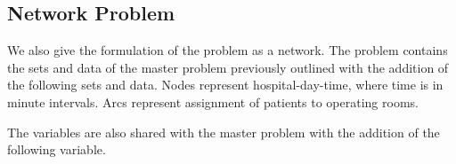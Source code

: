 \subsection{Network Problem}
We also give the formulation of the problem as a network. The problem contains the sets
and data of the master problem previously outlined with the addition of the following 
sets and data. Nodes represent hospital-day-time, where time is in minute intervals. Arcs represent assignment of patients to operating rooms.
\begin{table}[H]
    \caption*{\bf{SETS}}
    \end{table}
    \begin{table}[H]
        \caption*{\bf{DATA}}
        \end{table}
    The variables are also shared with the master problem with the addition of the following variable. 
\begin{table}[H]
    \caption*{\bf{VARIABLES}}
    \label{tab:NETvariables}
    \end{table}


